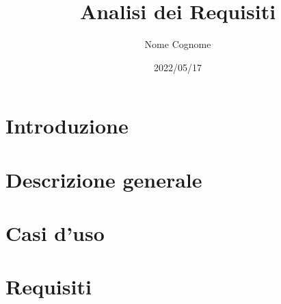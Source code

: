 \documentclass{classes/base}
\title{Analisi dei Requisiti}
\date{2022/05/17}
\author{Nome Cognome}
\begin{document}
	\maketitle
	\newpage
	\tableofcontents

	\newpage
	\section{Introduzione}
	

	\newpage
	\section{Descrizione generale}
	

	\newpage
	\section{Casi d'uso}
	

	\newpage
	\section{Requisiti}
	
\end{document}
